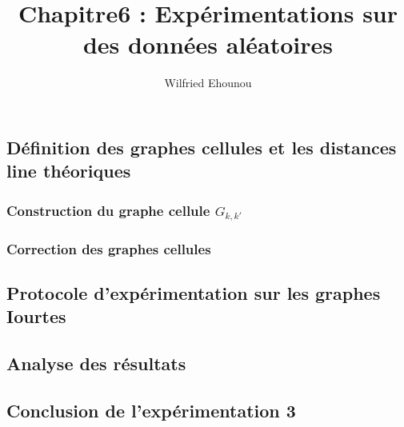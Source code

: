 \documentclass[onecolumn, 12pt]{book}
\title{Chapitre6 : Exp\'erimentations sur des donn\'ees al\'eatoires}
\author{Wilfried Ehounou}
\date{\oldstylenums{\today}}
\begin{document}
	
	\subsection{D\'efinition des graphes cellules et les distances line th\'eoriques}
		
		\subsubsection{Construction du graphe cellule $G_{k,k'}$ }
			
		\subsubsection{Correction des graphes cellules}
			
	\subsection{Protocole d'exp\'erimentation sur les graphes Iourtes}
		
	\subsection{Analyse des r\'esultats}
		
	\subsection{Conclusion de l'exp\'erimentation 3}
		
\end{document}
